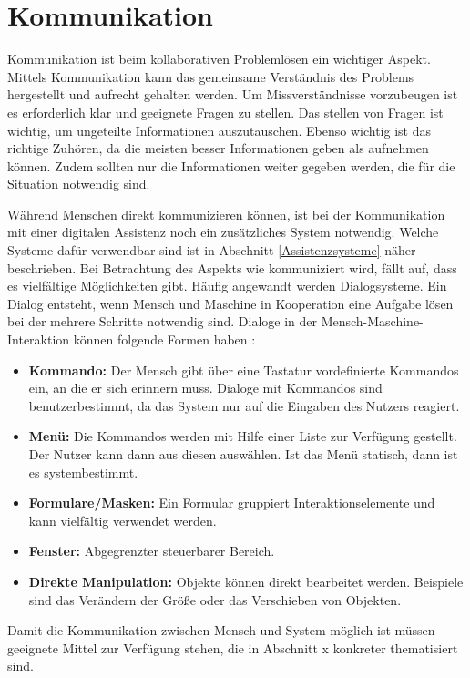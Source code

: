 \section{Kommunikation}
Kommunikation ist beim kollaborativen Problemlösen ein wichtiger Aspekt. Mittels Kommunikation kann das gemeinsame Verständnis des Problems hergestellt und aufrecht gehalten werden. Um Missverständnisse vorzubeugen ist es erforderlich klar und geeignete Fragen zu stellen. Das stellen von Fragen ist wichtig, um ungeteilte Informationen auszutauschen. Ebenso wichtig ist das richtige Zuhören, da die meisten besser Informationen geben als aufnehmen können. Zudem sollten nur die Informationen weiter gegeben werden, die für die Situation notwendig sind. \cite{Rohner2016}

Während Menschen direkt kommunizieren können, ist bei der Kommunikation mit einer digitalen Assistenz noch ein zusätzliches System notwendig. Welche Systeme dafür verwendbar sind ist in Abschnitt \ref{Assistenzsysteme} näher beschrieben. Bei Betrachtung des Aspekts wie kommuniziert wird, fällt auf, dass es vielfältige Möglichkeiten gibt. Häufig angewandt werden Dialogsysteme. Ein Dialog entsteht, wenn Mensch und Maschine in Kooperation eine Aufgabe lösen bei der mehrere Schritte notwendig sind. Dialoge in der Mensch-Maschine-Interaktion können folgende Formen haben \cite{Heinecke2012}:
\begin{itemize}
\item \textbf{Kommando:} Der Mensch gibt über eine Tastatur vordefinierte Kommandos ein, an die er sich erinnern muss. Dialoge mit Kommandos sind benutzerbestimmt, da das System nur auf die Eingaben des Nutzers reagiert.
\item \textbf{Menü:} Die Kommandos werden mit Hilfe einer Liste zur Verfügung gestellt. Der Nutzer kann dann aus diesen auswählen. Ist das Menü statisch, dann ist es systembestimmt.
\item \textbf{Formulare/Masken:} Ein Formular gruppiert Interaktionselemente und kann vielfältig verwendet werden.
\item \textbf{Fenster:} Abgegrenzter steuerbarer Bereich.
\item \textbf{Direkte Manipulation:} Objekte können direkt bearbeitet werden. Beispiele sind das Verändern der Größe oder das Verschieben von Objekten.
\end{itemize}
Damit die Kommunikation zwischen Mensch und System möglich ist müssen geeignete Mittel zur Verfügung stehen, die in Abschnitt x konkreter thematisiert sind.

